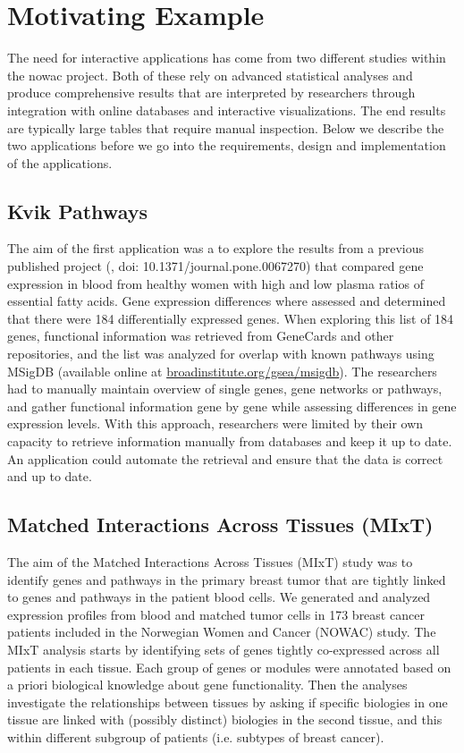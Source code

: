 \section{Motivating Example}
The need for interactive applications has come from two different studies
within the \gls{nowac} project. Both of these rely on advanced statistical
analyses and produce comprehensive results that are interpreted by researchers
through integration with online databases and interactive visualizations. The
end results are typically large tables that require manual inspection. Below we
describe the two applications before we go into the requirements, design and
implementation of the applications. 

\subsection{Kvik Pathways} 
The aim of the first application was a to explore the
results from a previous published project (\cite{olsen2013plasma}, doi:
10.1371/journal.pone.0067270) that compared gene expression in blood from
healthy women with high and low plasma ratios of essential fatty acids. Gene
expression differences where assessed and determined that there were 184
differentially expressed genes. When exploring this list of 184 genes,
functional information was retrieved from GeneCards and other repositories, and
the list was analyzed for overlap with known pathways using MSigDB (available
online at
\href{broadinstitute.org/gsea/msigdb}{broadinstitute.org/gsea/msigdb}). The
researchers had to manually maintain overview of single genes, gene networks or
pathways, and gather functional information gene by gene while assessing
differences in gene expression levels. With this approach, researchers were
limited by their own capacity to retrieve information manually from databases
and keep it up to date. An application could automate the retrieval and ensure
that the data is correct and up to date. 

\subsection{Matched Interactions Across Tissues (MIxT)}
The aim of the Matched Interactions Across Tissues (MIxT) study was to identify
genes and pathways in the primary breast tumor that are tightly linked to genes
and pathways in the patient blood cells.\cite{dumeaux2017interactions} We
generated and analyzed expression profiles from blood and matched tumor cells in
173 breast cancer patients included in the Norwegian Women and Cancer (NOWAC)
study.  The MIxT analysis starts by identifying sets of genes tightly
co-expressed across all patients in each tissue. Each group of genes or modules
were annotated based on a priori biological knowledge about gene functionality.
Then the analyses investigate the relationships between tissues by asking if
specific biologies in one tissue are linked with (possibly distinct) biologies
in the second tissue, and this within different subgroup of patients (i.e.
subtypes of breast cancer).


